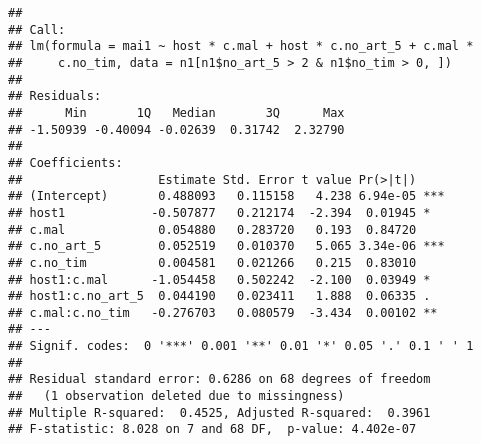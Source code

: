 \documentclass[]{article}
\newenvironment{Shaded}{\begin{snugshade}}{\end{snugshade}}
\newcommand{\KeywordTok}[1]{\textcolor[rgb]{0.13,0.29,0.53}{\textbf{#1}}}
\newcommand{\DataTypeTok}[1]{\textcolor[rgb]{0.13,0.29,0.53}{#1}}
\newcommand{\DecValTok}[1]{\textcolor[rgb]{0.00,0.00,0.81}{#1}}
\newcommand{\StringTok}[1]{\textcolor[rgb]{0.31,0.60,0.02}{#1}}
\newcommand{\OperatorTok}[1]{\textcolor[rgb]{0.81,0.36,0.00}{\textbf{#1}}}
\newcommand{\NormalTok}[1]{#1}
\begin{document}
\begin{verbatim}
## 
## Call:
## lm(formula = mai1 ~ host * c.mal + host * c.no_art_5 + c.mal * 
##     c.no_tim, data = n1[n1$no_art_5 > 2 & n1$no_tim > 0, ])
## 
## Residuals:
##      Min       1Q   Median       3Q      Max 
## -1.50939 -0.40094 -0.02639  0.31742  2.32790 
## 
## Coefficients:
##                   Estimate Std. Error t value Pr(>|t|)    
## (Intercept)       0.488093   0.115158   4.238 6.94e-05 ***
## host1            -0.507877   0.212174  -2.394  0.01945 *  
## c.mal             0.054880   0.283720   0.193  0.84720    
## c.no_art_5        0.052519   0.010370   5.065 3.34e-06 ***
## c.no_tim          0.004581   0.021266   0.215  0.83010    
## host1:c.mal      -1.054458   0.502242  -2.100  0.03949 *  
## host1:c.no_art_5  0.044190   0.023411   1.888  0.06335 .  
## c.mal:c.no_tim   -0.276703   0.080579  -3.434  0.00102 ** 
## ---
## Signif. codes:  0 '***' 0.001 '**' 0.01 '*' 0.05 '.' 0.1 ' ' 1
## 
## Residual standard error: 0.6286 on 68 degrees of freedom
##   (1 observation deleted due to missingness)
## Multiple R-squared:  0.4525, Adjusted R-squared:  0.3961 
## F-statistic: 8.028 on 7 and 68 DF,  p-value: 4.402e-07
\end{verbatim}

\begin{Shaded}
\end{Shaded}
\end{document}

